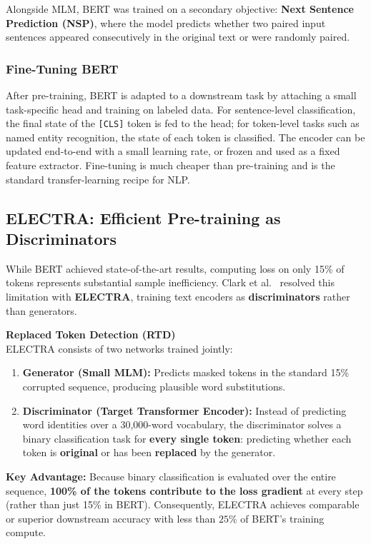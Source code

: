 Alongside MLM, BERT was trained on a secondary objective: \textbf{Next Sentence Prediction (NSP)}, where the model predicts whether two paired input sentences appeared consecutively in the original text or were randomly paired.

\subsubsection{Fine-Tuning BERT}

After pre-training, BERT is adapted to a downstream task by attaching a small task-specific head and training on labeled data. For sentence-level classification, the final state of the \texttt{[CLS]} token is fed to the head; for token-level tasks such as named entity recognition, the state of each token is classified. The encoder can be updated end-to-end with a small learning rate, or frozen and used as a fixed feature extractor. Fine-tuning is much cheaper than pre-training and is the standard transfer-learning recipe for NLP.

\subsection{\texorpdfstring{ELECTRA:}{ELECTRA:} Efficient Pre-training as Discriminators}

While BERT achieved state-of-the-art results, computing loss on only 15\% of tokens represents substantial sample inefficiency. Clark et al.~\cite{clark2020electra} resolved this limitation with \textbf{ELECTRA}, training text encoders as \textbf{discriminators} rather than generators.

\begin{keywordbox}
\textbf{Replaced Token Detection (RTD)} \\
ELECTRA consists of two networks trained jointly:
\begin{enumerate}[nosep, leftmargin=*]
    \item \textbf{Generator (Small MLM):} Predicts masked tokens in the standard 15\% corrupted sequence, producing plausible word substitutions.
    \item \textbf{Discriminator (Target Transformer Encoder):} Instead of predicting word identities over a 30,000-word vocabulary, the discriminator solves a binary classification task for \textbf{every single token}: predicting whether each token is \textbf{original} or has been \textbf{replaced} by the generator.
\end{enumerate}
\textbf{Key Advantage:}
Because binary classification is evaluated over the entire sequence, \textbf{100\% of the tokens contribute to the loss gradient} at every step (rather than just 15\% in BERT). Consequently, ELECTRA achieves comparable or superior downstream accuracy with less than $25\%$ of BERT's training compute.
\end{keywordbox}

